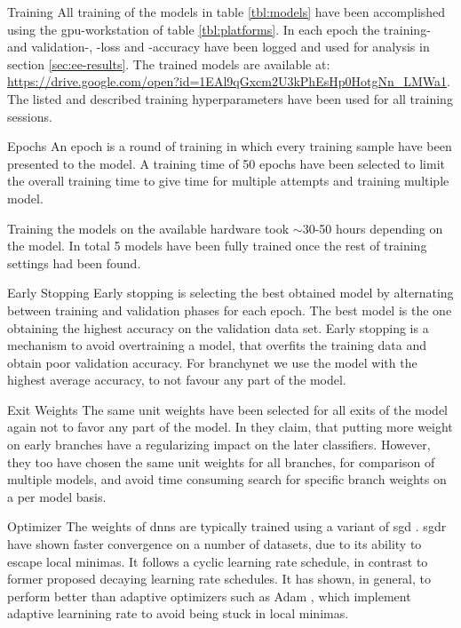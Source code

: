 \begin{enumdescript}
	\item[Training] All training of the models in table \ref{tbl:models} have been accomplished using the \gls{gpu}-workstation of table \ref{tbl:platforms}. In each epoch the training- and validation-, -loss and -accuracy have been logged and used for analysis in section \ref{sec:ee-results}. The trained models are available at: {\color{sns-grey}\url{https://drive.google.com/open?id=1EAl9qGxcm2U3kPhEsHp0HotgNn_LMWa1}}.
	The listed and described training hyperparameters have been used for all training sessions. 
	
	\begin{enumdescript}
		\item[Epochs] An epoch is a round of training in which every training sample have been presented to the model. A training time of 50 epochs have been selected to limit the overall training time to give time for multiple attempts and training multiple model.
		
		Training the models on the available hardware took $\sim$30-50 hours depending on the model. In total 5 models have been fully trained once the rest of training settings had been found.
		
		\item[Early Stopping] Early stopping is selecting the best obtained model by alternating between training and validation phases for each epoch. The best model is the one obtaining the highest accuracy on the validation data set. Early stopping is a mechanism to avoid overtraining a model, that overfits the training data and obtain poor validation accuracy. For \gls{branchynet} we use the model with the highest average accuracy, to not favour any part of the model.  
		
		\item[Exit Weights] The same unit weights have been selected for all exits of the model again not to favor any part of the model. In \cite{teerapittayanon_branchynet:_2016} they claim, that putting more weight on early branches have a regularizing impact on the later classifiers. However, they too have chosen the same unit weights for all branches, for comparison of multiple models, and avoid time consuming search for specific branch weights on a per model basis.
		
		\item[Optimizer] The weights of \gls{dnn}s are typically trained using a variant of \gls{sgd} \cite{goodfellow_deep_2016}. \gls{sgdr} \cite{loshchilov_sgdr:_2016} have shown faster convergence on a number of datasets, due to its ability to escape local minimas. It follows a cyclic learning rate schedule, in contrast to former proposed decaying learning rate schedules. It has shown, in general, to perform better than adaptive optimizers such as Adam \cite{kingma_adam:_2014}, which implement adaptive learnining rate to avoid being stuck in local minimas. 
		

\end{enumdescript}
\end{enumdescript}
